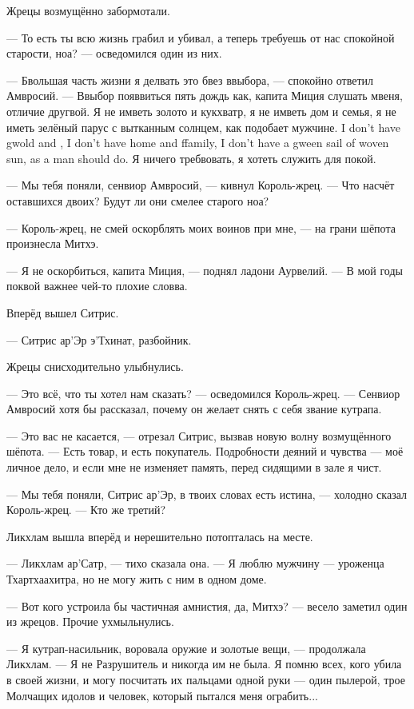 Жрецы возмущённо забормотали.

--- То есть ты всю жизнь грабил и убивал, а теперь требуешь от нас спокойной старости, ноа? --- осведомился один из них.

--- Бвольшая часть жизни я делвать это бвез ввыбора, --- спокойно ответил Амвросий.
--- Ввыбор появвиться пять дождь как, капита Миция слушать мвеня, отличие другвой.
{Я не имветь золото и кукхватр, я не имветь дом и семья, я не иметь зелёный парус с вытканным солнцем\FM, как подобает мужчине.}
{I don't have gwold and \kukchuatr, I don't have home and ffamily, I don't have a gween sail of woven sun\FM, as a man should do.}
Я ничего требвовать, я хотеть служить для покой.

--- Мы тебя поняли, сенвиор Амвросий, --- кивнул Король-жрец.
--- Что насчёт оставшихся двоих?
Будут ли они смелее старого ноа?

--- Король-жрец, не смей оскорблять моих воинов при мне, --- на грани шёпота произнесла Митхэ.

--- Я не оскорбиться, капита Миция, --- поднял ладони Аурвелий.
--- В мой годы поквой важнее чей-то плохие словва.

Вперёд вышел Ситрис.

--- Ситрис ар'Эр э'Тхинат, разбойник.

Жрецы снисходительно улыбнулись.

--- Это всё, что ты хотел нам сказать? --- осведомился Король-жрец.
--- Сенвиор Амвросий хотя бы рассказал, почему он желает снять с себя звание кутрапа.

--- Это вас не касается, --- отрезал Ситрис, вызвав новую волну возмущённого шёпота.
--- Есть товар, и есть покупатель.
Подробности деяний и чувства --- моё личное дело, и если мне не изменяет память, перед сидящими в зале я чист.

--- Мы тебя поняли, Ситрис ар'Эр, в твоих словах есть истина, --- холодно сказал Король-жрец.
--- Кто же третий?

Ликхлам вышла вперёд и нерешительно потопталась на месте.

--- Ликхлам ар'Сатр, --- тихо сказала она.
--- Я люблю мужчину --- уроженца Тхартхаахитра, но не могу жить с ним в одном доме.

--- Вот кого устроила бы частичная амнистия, да, Митхэ? --- весело заметил один из жрецов.
Прочие ухмыльнулись.

--- Я кутрап-насильник, воровала оружие и золотые вещи, --- продолжала Ликхлам.
--- Я не Разрушитель и никогда им не была.
Я помню всех, кого убила в своей жизни, и могу посчитать их пальцами одной руки --- один пылерой, трое Молчащих идолов и человек, который пытался меня ограбить...


